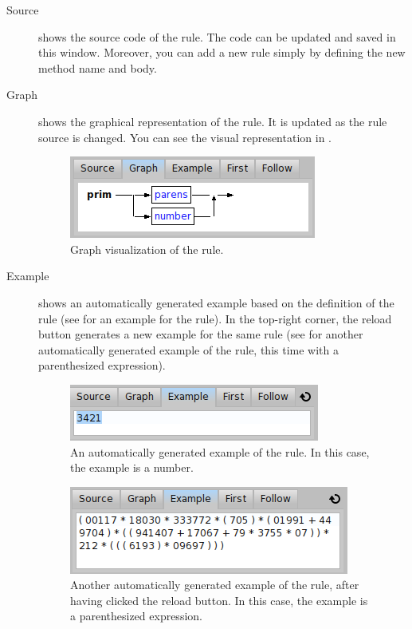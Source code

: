 \documentclass[a4paper,10pt,twoside]{book}
\begin{document}
\begin{description}
\item[Source] shows the source code of the rule.
  The code can be updated and saved in this window.
  Moreover, you can add a new rule simply by defining the new method name and body.
\item[Graph]  shows the graphical representation of the rule.
  It is updated as the rule source is changed.
  You can see the  visual representation in .
  \begin{figure}[ht]
    \begin{center}
      \includegraphics[width=.4\linewidth]{PPBrowserGraph}
      \caption{Graph visualization of the 
        rule. \label{fig:pp/browserGraph}}
    \end{center}
  \end{figure}
\item[Example] shows an automatically generated example based on the
  definition of the rule (see  for an
  example for the  rule). In the top-right corner, the reload
  button generates a new example for the same rule (see
   for another automatically generated
  example of the  rule, this time with a parenthesized
  expression).
  \begin{figure}[ht]
    \begin{center}
      \includegraphics[width=.4\linewidth]{PPBrowserExample1}
      \caption{An automatically generated example of the 
        rule. In this case, the  example is a
        number. \label{fig:pp/browserExample1}}
    \end{center}
  \end{figure}
  \begin{figure}[ht]
    \begin{center}
      \includegraphics[width=.4\linewidth]{PPBrowserExample2}
      \caption{Another automatically generated example of the
         rule, after having clicked the reload button. In
        this case, the  example is a parenthesized
        expression. \label{fig:pp/browserExample2}}
    \end{center}
  \end{figure}


\end{description}
\end{document}
